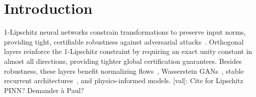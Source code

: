 \documentclass[10pt]{article}
\theoremstyle{plain}
\theoremstyle{definition}
\theoremstyle{remark}
\newcommand{\va}[1]{{\color{yellow}[val]: #1}}
\newcommand{\va}[1]{}
\begin{document}
\section{Introduction}
\label{sec:intro}

    1-Lipschitz neural networks constrain transformations to preserve input norms, providing tight, certifiable robustness against adversarial attacks~\cite{szegedy_intriguing_2013, anil_sorting_2019}. Orthogonal layers reinforce the 1-Lipschitz constraint by requiring an exact unity constant in almost all directions, providing tighter global certification guarantees. Besides robustness, these layers benefit normalizing flows~\cite{kingma2018glow,behrmann2019invertible}, Wasserstein GANs~\cite{arjovsky2017wasserstein,gulrajani2017improved}, stable recurrent architectures~\cite{kiani_projunn_2022,qi_deep_isometric_2020,bansal2018gainorthogonalityregularizationstraining}, and physics-informed models. \va{Cite for Lipschitz PINN? Demander à Paul?}
\end{document}
